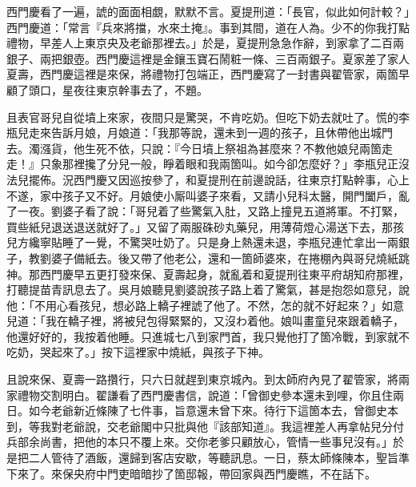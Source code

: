 西門慶看了一遍，諕的面面相覷，默默不言。夏提刑道：「長官，似此如何計較？」西門慶道：「常言『兵來將擋，水來土掩』。事到其間，道在人為。少不的你我打點禮物，早差人上東京央及老爺那裡去。」於是，夏提刑急急作辭，到家拿了二百兩銀子、兩把銀壺。西門慶這裡是金鑲玉寶石鬧粧一條、三百兩銀子。夏家差了家人夏壽，西門慶這裡是來保，將禮物打包端正，西門慶寫了一封書與翟管家，兩箇早顧了頭口，星夜往東京幹事去了，不題。

且表官哥兒自從墳上來家，夜間只是驚哭，不肯吃奶。但吃下奶去就吐了。慌的李瓶兒走來告訴月娘，月娘道：「我那等說，還未到一週的孩子，且休帶他出城門去。濁漒貨，他生死不依，只說：『今日墳上祭祖為甚麼來？不教他娘兒兩箇走走！』只象那裡攙了分兒一般，睜着眼和我兩箇叫。如今卻怎麼好？」{}李瓶兒正沒法兒擺佈。況西門慶又因巡按參了，和夏提刑在前邊說話，往東京打點幹事，心上不遂，家中孩子又不好。月娘使小厮叫婆子來看，又請小兒科太醫，開門闔戶，亂了一夜。劉婆子看了說：「哥兒着了些驚氣入肚，又路上撞見五道將軍。不打緊，買些紙兒退送退送就好了。」又留了兩服硃砂丸藥兒，用薄荷燈心湯送下去，那孩兒方纔寧貼睡了一覺，不驚哭吐奶了。只是身上熱還未退，李瓶兒連忙拿出一兩銀子，教劉婆子備紙去。後又帶了他老公，還和一箇師婆來，在捲棚內與哥兒燒紙跳神。那西門慶早五更打發來保、夏壽起身，就亂着和夏提刑往東平府胡知府那裡，打聽提苗青訊息去了。吳月娘聽見劉婆說孩子路上着了驚氣，甚是抱怨如意兒，{}說他：「不用心看孩兒，想必路上轎子裡諕了他了。不然，怎的就不好起來？」如意兒道：「我在轎子裡，將被兒包得緊緊的，又沒わ着他。娘叫畫童兒來跟着轎子，他還好好的，我按着他睡。只進城七八到家門首，我只覺他打了箇冷戰，到家就不吃奶，哭起來了。」{}按下這裡家中燒紙，與孩子下神。

且說來保、夏壽一路攢行，只六日就趕到東京城內。到太師府內見了翟管家，將兩家禮物交割明白。翟謙看了西門慶書信，說道：「曾御史參本還未到哩，{}你且住兩日。如今老爺新近條陳了七件事，旨意還未曾下來。待行下這箇本去，曾御史本到，等我對老爺說，交老爺閣中只批與他『該部知道』。我這裡差人再拿帖兒分付兵部余尚書，把他的本只不覆上來。交你老爹只顧放心，管情一些事兒沒有。」於是把二人管待了酒飯，還歸到客店安歇，等聽訊息。一日，蔡太師條陳本，聖旨準下來了。來保央府中門吏暗暗抄了箇邸報，帶回家與西門慶瞧，不在話下。

